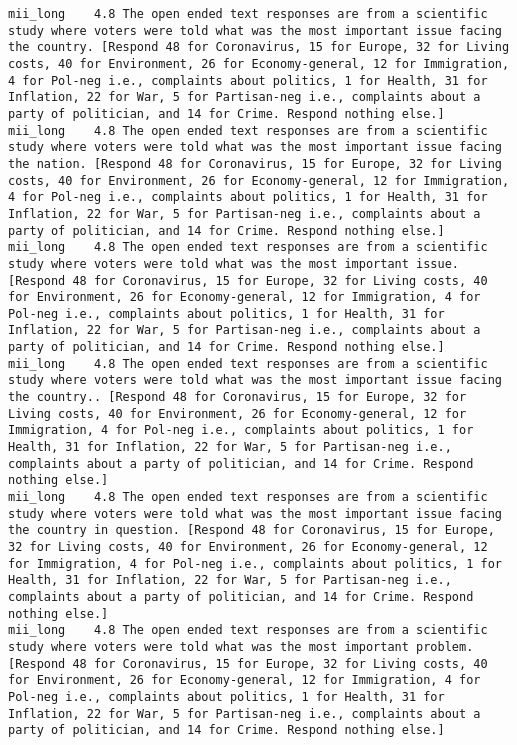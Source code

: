 \begin{lstlisting}[label=lst:promptvariants]
mii_long	4.8	The open ended text responses are from a scientific study where voters were told what was the most important issue facing the country. [Respond 48 for Coronavirus, 15 for Europe, 32 for Living costs, 40 for Environment, 26 for Economy-general, 12 for Immigration, 4 for Pol-neg i.e., complaints about politics, 1 for Health, 31 for Inflation, 22 for War, 5 for Partisan-neg i.e., complaints about a party of politician, and 14 for Crime. Respond nothing else.]
mii_long	4.8	The open ended text responses are from a scientific study where voters were told what was the most important issue facing the nation. [Respond 48 for Coronavirus, 15 for Europe, 32 for Living costs, 40 for Environment, 26 for Economy-general, 12 for Immigration, 4 for Pol-neg i.e., complaints about politics, 1 for Health, 31 for Inflation, 22 for War, 5 for Partisan-neg i.e., complaints about a party of politician, and 14 for Crime. Respond nothing else.]
mii_long	4.8	The open ended text responses are from a scientific study where voters were told what was the most important issue. [Respond 48 for Coronavirus, 15 for Europe, 32 for Living costs, 40 for Environment, 26 for Economy-general, 12 for Immigration, 4 for Pol-neg i.e., complaints about politics, 1 for Health, 31 for Inflation, 22 for War, 5 for Partisan-neg i.e., complaints about a party of politician, and 14 for Crime. Respond nothing else.]
mii_long	4.8	The open ended text responses are from a scientific study where voters were told what was the most important issue facing the country.. [Respond 48 for Coronavirus, 15 for Europe, 32 for Living costs, 40 for Environment, 26 for Economy-general, 12 for Immigration, 4 for Pol-neg i.e., complaints about politics, 1 for Health, 31 for Inflation, 22 for War, 5 for Partisan-neg i.e., complaints about a party of politician, and 14 for Crime. Respond nothing else.]
mii_long	4.8	The open ended text responses are from a scientific study where voters were told what was the most important issue facing the country in question. [Respond 48 for Coronavirus, 15 for Europe, 32 for Living costs, 40 for Environment, 26 for Economy-general, 12 for Immigration, 4 for Pol-neg i.e., complaints about politics, 1 for Health, 31 for Inflation, 22 for War, 5 for Partisan-neg i.e., complaints about a party of politician, and 14 for Crime. Respond nothing else.]
mii_long	4.8	The open ended text responses are from a scientific study where voters were told what was the most important problem. [Respond 48 for Coronavirus, 15 for Europe, 32 for Living costs, 40 for Environment, 26 for Economy-general, 12 for Immigration, 4 for Pol-neg i.e., complaints about politics, 1 for Health, 31 for Inflation, 22 for War, 5 for Partisan-neg i.e., complaints about a party of politician, and 14 for Crime. Respond nothing else.]

\end{lstlisting}
